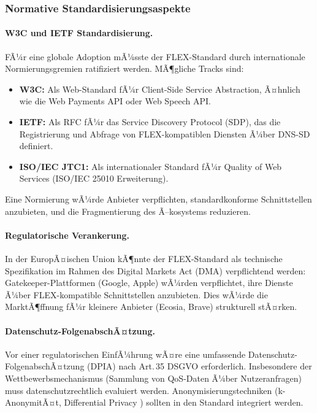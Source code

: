 ﻿\documentclass[a4paper,12pt]{article}
\theoremstyle{definition}
\begin{document}
\subsubsection{Normative Standardisierungsaspekte}

\paragraph{W3C und IETF Standardisierung.}
FÃ¼r eine globale Adoption mÃ¼sste der FLEX-Standard durch internationale Normierungsgremien ratifiziert werden. MÃ¶gliche Tracks sind:
\begin{itemize}
    \item \textbf{W3C:} Als Web-Standard fÃ¼r Client-Side Service Abstraction, Ã¤hnlich wie die Web Payments API oder Web Speech API.
    \item \textbf{IETF:} Als RFC fÃ¼r das Service Discovery Protocol (SDP), das die Registrierung und Abfrage von FLEX-kompatiblen Diensten Ã¼ber DNS-SD definiert.
    \item \textbf{ISO/IEC JTC1:} Als internationaler Standard fÃ¼r Quality of Web Services (ISO/IEC 25010 Erweiterung).
\end{itemize}
Eine Normierung wÃ¼rde Anbieter verpflichten, standardkonforme Schnittstellen anzubieten, und die Fragmentierung des Ã–kosystems reduzieren.

\paragraph{Regulatorische Verankerung.}
In der EuropÃ¤ischen Union kÃ¶nnte der FLEX-Standard als technische Spezifikation im Rahmen des Digital Markets Act (DMA) verpflichtend werden: Gatekeeper-Plattformen (Google, Apple) wÃ¼rden verpflichtet, ihre Dienste Ã¼ber FLEX-kompatible Schnittstellen anzubieten. Dies wÃ¼rde die MarktÃ¶ffnung fÃ¼r kleinere Anbieter (Ecosia, Brave) strukturell stÃ¤rken.

\paragraph{Datenschutz-FolgenabschÃ¤tzung.}
Vor einer regulatorischen EinfÃ¼hrung wÃ¤re eine umfassende Datenschutz-FolgenabschÃ¤tzung (DPIA) nach Art.\,35 DSGVO erforderlich. Insbesondere der Wettbewerbsmechanismus (Sammlung von QoS-Daten Ã¼ber Nutzeranfragen) muss datenschutzrechtlich evaluiert werden. Anonymisierungstechniken (k-AnonymitÃ¤t, Differential Privacy \cite{dwork2006}) sollten in den Standard integriert werden.
\end{document}
